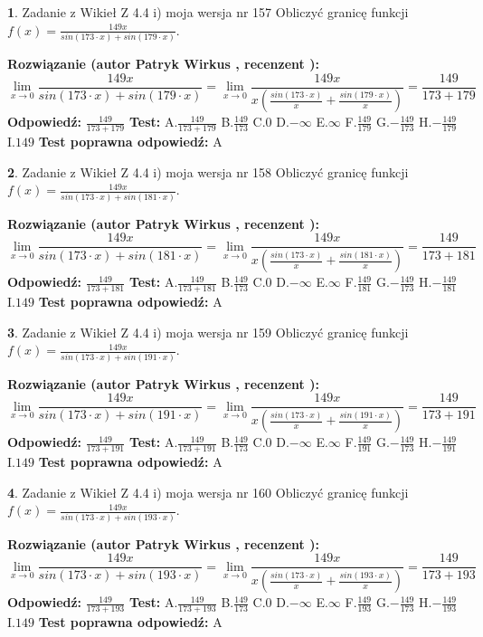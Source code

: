 \documentclass[12pt, a4paper]{article}
\theoremstyle{definition} %
\newtheorem{zad}{}
\newcommand{\zadStart}[1]{\begin{zad}#1\newline}
\newcommand{\zadStop}{\end{zad}}
\newcommand{\rozwStart}[2]{\noindent \textbf{Rozwiązanie (autor #1 , recenzent #2): }\newline}
\newcommand{\rozwStop}{\newline}
\newcommand{\odpStart}{\noindent \textbf{Odpowiedź:}\newline}
\newcommand{\odpStop}{\newline}
\newcommand{\testStart}{\noindent \textbf{Test:}\newline}
\newcommand{\testStop}{\newline}
\newcommand{\kluczStart}{\noindent \textbf{Test poprawna odpowiedź:}\newline}
\newcommand{\kluczStop}{\newline}
\begin{document}
\zadStart{Zadanie z Wikieł Z 4.4 i) moja wersja nr 157}
Obliczyć granicę funkcji $f(x)=\frac{149x}{sin(173\cdot x) +sin(179\cdot x)}$.
\zadStop
\rozwStart{Patryk Wirkus}{}
$$\lim\limits_{x\to 0}\frac{149x}{sin(173\cdot x) +sin(179\cdot x)}=\lim\limits_{x\to 0}\frac{149x}{x(\frac{sin(173\cdot x)}{x}+\frac{sin(179\cdot x)}{x})}=\frac{149}{173+179}$$
\rozwStop
\odpStart
$\frac{149}{173+179}$
\odpStop
\testStart
A.$\frac{149}{173+179}$
B.$\frac{149}{173}$
C.$0$
D.$-\infty$
E.$\infty$
F.$\frac{149}{179}$
G.$-\frac{149}{173}$
H.$-\frac{149}{179}$
I.$149$
\testStop
\kluczStart
A
\kluczStop



\zadStart{Zadanie z Wikieł Z 4.4 i) moja wersja nr 158}
Obliczyć granicę funkcji $f(x)=\frac{149x}{sin(173\cdot x) +sin(181\cdot x)}$.
\zadStop
\rozwStart{Patryk Wirkus}{}
$$\lim\limits_{x\to 0}\frac{149x}{sin(173\cdot x) +sin(181\cdot x)}=\lim\limits_{x\to 0}\frac{149x}{x(\frac{sin(173\cdot x)}{x}+\frac{sin(181\cdot x)}{x})}=\frac{149}{173+181}$$
\rozwStop
\odpStart
$\frac{149}{173+181}$
\odpStop
\testStart
A.$\frac{149}{173+181}$
B.$\frac{149}{173}$
C.$0$
D.$-\infty$
E.$\infty$
F.$\frac{149}{181}$
G.$-\frac{149}{173}$
H.$-\frac{149}{181}$
I.$149$
\testStop
\kluczStart
A
\kluczStop



\zadStart{Zadanie z Wikieł Z 4.4 i) moja wersja nr 159}
Obliczyć granicę funkcji $f(x)=\frac{149x}{sin(173\cdot x) +sin(191\cdot x)}$.
\zadStop
\rozwStart{Patryk Wirkus}{}
$$\lim\limits_{x\to 0}\frac{149x}{sin(173\cdot x) +sin(191\cdot x)}=\lim\limits_{x\to 0}\frac{149x}{x(\frac{sin(173\cdot x)}{x}+\frac{sin(191\cdot x)}{x})}=\frac{149}{173+191}$$
\rozwStop
\odpStart
$\frac{149}{173+191}$
\odpStop
\testStart
A.$\frac{149}{173+191}$
B.$\frac{149}{173}$
C.$0$
D.$-\infty$
E.$\infty$
F.$\frac{149}{191}$
G.$-\frac{149}{173}$
H.$-\frac{149}{191}$
I.$149$
\testStop
\kluczStart
A
\kluczStop



\zadStart{Zadanie z Wikieł Z 4.4 i) moja wersja nr 160}
Obliczyć granicę funkcji $f(x)=\frac{149x}{sin(173\cdot x) +sin(193\cdot x)}$.
\zadStop
\rozwStart{Patryk Wirkus}{}
$$\lim\limits_{x\to 0}\frac{149x}{sin(173\cdot x) +sin(193\cdot x)}=\lim\limits_{x\to 0}\frac{149x}{x(\frac{sin(173\cdot x)}{x}+\frac{sin(193\cdot x)}{x})}=\frac{149}{173+193}$$
\rozwStop
\odpStart
$\frac{149}{173+193}$
\odpStop
\testStart
A.$\frac{149}{173+193}$
B.$\frac{149}{173}$
C.$0$
D.$-\infty$
E.$\infty$
F.$\frac{149}{193}$
G.$-\frac{149}{173}$
H.$-\frac{149}{193}$
I.$149$
\testStop
\kluczStart
A
\kluczStop
\end{document}

